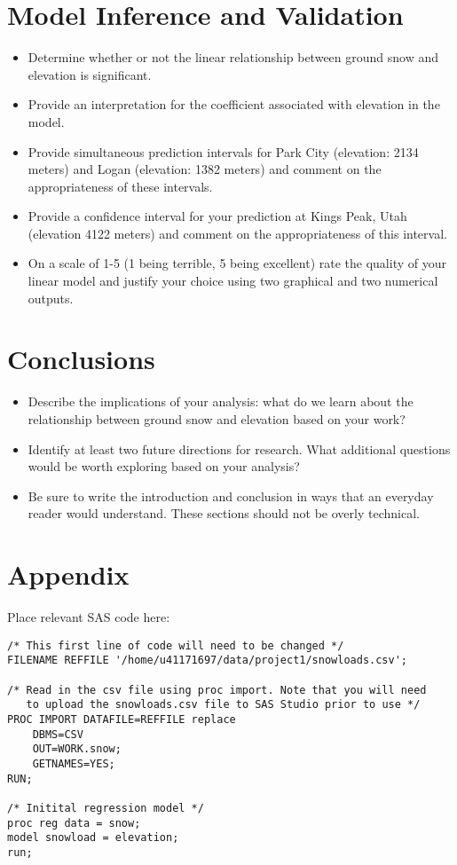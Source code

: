 \documentclass[11pt]{article}
\begin{document}
\section{Model Inference and Validation}
\begin{itemize}
\item Determine whether or not the linear relationship between ground snow and elevation is significant. 
\item Provide an interpretation for the coefficient associated with elevation in the model. 
\item Provide simultaneous prediction intervals for Park City (elevation: 2134 meters) and Logan (elevation: 1382 meters) and comment on the appropriateness of these intervals. 
\item Provide a confidence interval for your prediction at Kings Peak, Utah (elevation 4122 meters) and comment on the appropriateness of this interval. 
\item On a scale of 1-5 (1 being terrible, 5 being excellent) rate the quality of your linear model and justify your choice using two graphical and two numerical outputs. 
\end{itemize}

\section{Conclusions}
\begin{itemize}
\item Describe the implications of your analysis: what do we learn about the relationship between ground snow and elevation based on your work?
\item Identify at least two future directions for research. What additional questions would be worth exploring based on your analysis? 
\item Be sure to write the introduction and conclusion in ways that an everyday reader would understand. These sections should not be overly technical. 
\end{itemize}

  


\appendix
\section{Appendix}
Place relevant SAS code here:

\begin{verbatim}
/* This first line of code will need to be changed */
FILENAME REFFILE '/home/u41171697/data/project1/snowloads.csv';

/* Read in the csv file using proc import. Note that you will need
   to upload the snowloads.csv file to SAS Studio prior to use */ 
PROC IMPORT DATAFILE=REFFILE replace
	DBMS=CSV
	OUT=WORK.snow;
	GETNAMES=YES;
RUN;

/* Initital regression model */
proc reg data = snow;
model snowload = elevation;
run;

\end{verbatim}
\end{document}
